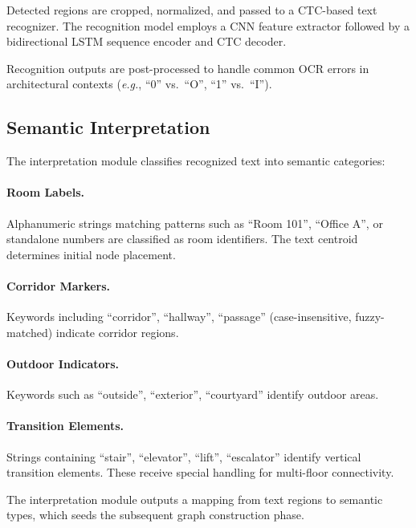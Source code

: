 \documentclass[manuscript,screen,review]{acmart}
\newcommand{\eg}{\textit{e.g.}}
\begin{document}
Detected regions are cropped, normalized, and passed to a CTC-based text recognizer. The recognition model employs a CNN feature extractor followed by a bidirectional LSTM sequence encoder and CTC decoder.


Recognition outputs are post-processed to handle common OCR errors in architectural contexts (\eg, ``0'' vs.\ ``O'', ``1'' vs.\ ``I'').

\subsection{Semantic Interpretation}
\label{sec:interpretation}

The interpretation module classifies recognized text into semantic categories:

\paragraph{Room Labels.} Alphanumeric strings matching patterns such as ``Room 101'', ``Office A'', or standalone numbers are classified as room identifiers. The text centroid determines initial node placement.

\paragraph{Corridor Markers.} Keywords including ``corridor'', ``hallway'', ``passage'' (case-insensitive, fuzzy-matched) indicate corridor regions.

\paragraph{Outdoor Indicators.} Keywords such as ``outside'', ``exterior'', ``courtyard'' identify outdoor areas.

\paragraph{Transition Elements.} Strings containing ``stair'', ``elevator'', ``lift'', ``escalator'' identify vertical transition elements. These receive special handling for multi-floor connectivity.


The interpretation module outputs a mapping from text regions to semantic types, which seeds the subsequent graph construction phase.
\end{document}
